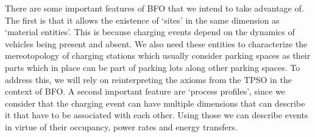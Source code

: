 There are some important features of BFO that we intend to take advantage of.
The first is that it allows the existence of `sites' in the same dimension as
`material entities'. This is because charging events depend on the dynamics of
vehicles being present and absent. We also need these entities to characterize
the mereotopology of charging stations which usually consider parking spaces as
their parts which in place can be part of parking lots along other parking
spaces. To address this, we will rely on reinterpreting the axioms from the
TPSO in the context of BFO. A second important feature are `process profiles',
since we consider that the charging event can have multiple dimensions that can
describe it that have to be associated with each other. Using those we can
describe events in virtue of their occupancy, power rates and energy transfers.
